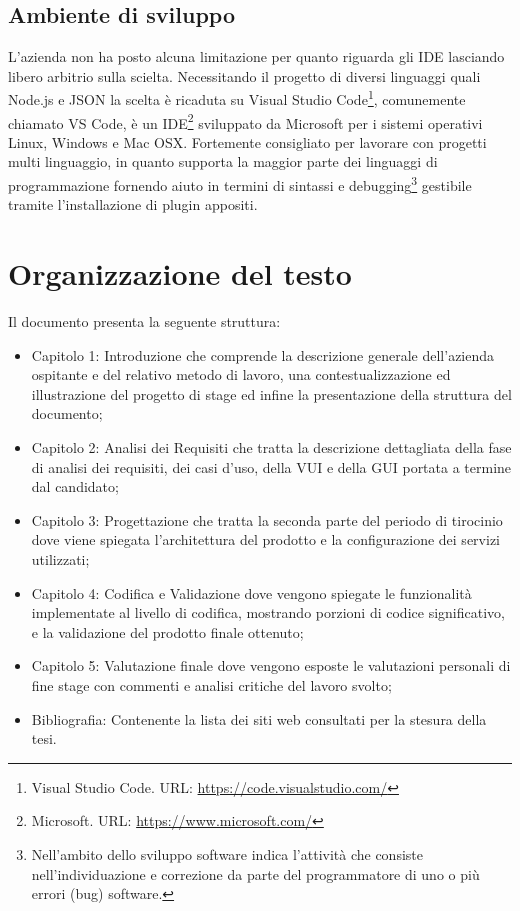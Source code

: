 \subsection{Ambiente di sviluppo}
L’azienda non ha posto alcuna limitazione per quanto riguarda gli IDE lasciando libero arbitrio sulla scielta. Necessitando il progetto di diversi linguaggi quali Node.js e JSON la scelta è ricaduta su Visual Studio Code\footnote{Visual Studio Code. URL: \href{https://code.visualstudio.com/}{https://code.visualstudio.com/}}, comunemente chiamato VS Code, è un IDE\footnote{Microsoft. URL: \href{https://www.microsoft.com/}{https://www.microsoft.com/}} sviluppato da Microsoft per i sistemi operativi Linux, Windows e Mac OSX. Fortemente consigliato per lavorare con progetti multi linguaggio, in quanto supporta la maggior parte dei linguaggi di programmazione fornendo aiuto in termini di sintassi e debugging\footnote{Nell'ambito dello sviluppo software indica l'attività che consiste nell'individuazione e correzione da parte del programmatore di uno o più errori (bug) software.} gestibile tramite l'installazione di plugin appositi.
\section{Organizzazione del testo}
Il documento presenta la seguente struttura:
\begin{itemize}
    \item Capitolo 1: Introduzione che comprende la descrizione generale dell'azienda ospitante e del relativo metodo di lavoro, una contestualizzazione ed illustrazione del progetto di stage ed infine la presentazione della struttura del documento;
    \item Capitolo 2: Analisi dei Requisiti che tratta la descrizione dettagliata della fase di analisi dei requisiti, dei casi d'uso, della VUI e della GUI portata a termine dal candidato;
    \item Capitolo 3: Progettazione che tratta la seconda parte del periodo di tirocinio dove viene spiegata l'architettura del prodotto e la configurazione dei servizi utilizzati;
    \item Capitolo 4: Codifica e Validazione dove vengono spiegate le funzionalità implementate al livello di codifica, mostrando porzioni di codice significativo, e la validazione del prodotto finale ottenuto;
    \item Capitolo 5: Valutazione finale dove vengono esposte le valutazioni personali di fine stage con commenti e analisi critiche del lavoro svolto;
    \item Bibliografia: Contenente la lista dei siti web consultati per la stesura della tesi.
\end{itemize}




